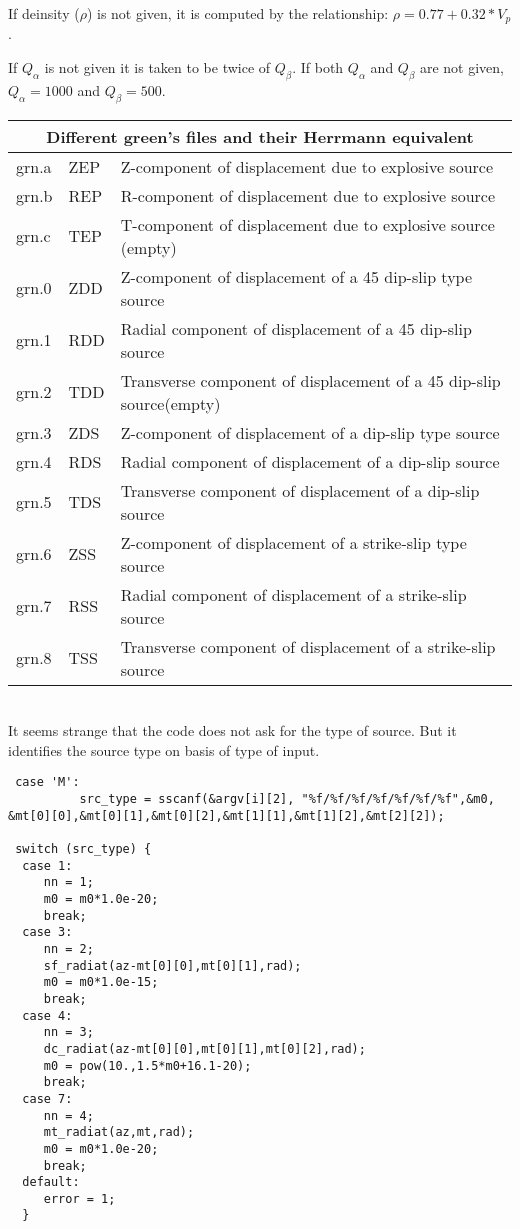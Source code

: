 \documentclass[11pt,titlepage,fleqn]{article}
\begin{document}
If deinsity ($\rho$) is not given, it is computed by the relationship: $\rho = 0.77 + 0.32*V_p$.

If  $Q_\alpha$ is not given it is taken to be twice of  $Q_\beta$.
If both  $Q_\alpha$ and  $Q_\beta$ are not given,  $Q_\alpha= 1000$ and $Q_\beta=500$.

\begin{center}
\begin{tabular}{|l|l|l|}
\hline
\multicolumn{3}{|c|}{\bf Different green's files and their Herrmann equivalent} \\
\hline
grn.a & ZEP & Z-component of displacement due to explosive source\\
grn.b & REP & R-component of displacement due to explosive source\\
grn.c & TEP & T-component of displacement due to explosive source (empty)\\
\hline
grn.0 & ZDD & Z-component of displacement of a 45 dip-slip type source\\
grn.1 & RDD & Radial component of displacement of a 45 dip-slip source\\
grn.2 & TDD & Transverse component of displacement of a 45 dip-slip source(empty)\\
\hline
grn.3 & ZDS & Z-component of displacement of a dip-slip type source\\
grn.4 & RDS & Radial component of displacement of a dip-slip source\\
grn.5 & TDS & Transverse component of displacement of a dip-slip source\\
\hline
grn.6 & ZSS & Z-component of displacement of a strike-slip type source\\
grn.7 & RSS & Radial component of displacement of a strike-slip source\\
grn.8 & TSS & Transverse component of displacement of a strike-slip source\\
\hline
\end{tabular}
\end{center}

\\
It seems strange that the code does not ask for the type of source. But it identifies the source type on basis of type of input.

\begin{verbatim}
 case 'M':
	      src_type = sscanf(&argv[i][2], "%f/%f/%f/%f/%f/%f/%f",&m0,
&mt[0][0],&mt[0][1],&mt[0][2],&mt[1][1],&mt[1][2],&mt[2][2]);

 switch (src_type) {
  case 1:
     nn = 1;
     m0 = m0*1.0e-20;
     break;
  case 3:
     nn = 2;
     sf_radiat(az-mt[0][0],mt[0][1],rad);
     m0 = m0*1.0e-15;
     break;
  case 4:
     nn = 3;
     dc_radiat(az-mt[0][0],mt[0][1],mt[0][2],rad);
     m0 = pow(10.,1.5*m0+16.1-20);
     break;
  case 7:
     nn = 4;
     mt_radiat(az,mt,rad);
     m0 = m0*1.0e-20;
     break;
  default:
     error = 1;
  }
\end{verbatim}
\end{document}
